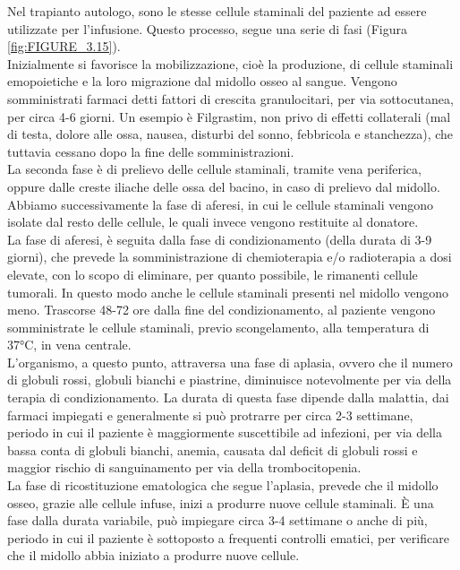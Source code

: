 Nel trapianto autologo, sono le stesse cellule staminali del paziente ad essere utilizzate per l’infusione. 
Questo processo, segue una serie di fasi (Figura \ref{fig:FIGURE_3.15}).\\
Inizialmente si favorisce la mobilizzazione, cioè la produzione, di cellule staminali emopoietiche e la 
loro migrazione dal midollo osseo al sangue. Vengono somministrati farmaci detti fattori di crescita granulocitari, 
per via sottocutanea, per circa 4-6 giorni\cite{TRAPIANTO}. Un esempio è Filgrastim, non privo di effetti 
collaterali (mal di testa, dolore alle ossa, nausea, disturbi del sonno, febbricola e stanchezza), 
che tuttavia cessano dopo la fine delle somministrazioni\cite{STEMCELLS}.\\
La seconda fase è di prelievo delle cellule staminali, tramite vena periferica, oppure dalle creste iliache delle 
ossa del bacino, in caso di prelievo dal midollo.\\ 
Abbiamo successivamente la fase di aferesi, in cui le cellule staminali vengono isolate dal resto delle cellule, 
le quali invece vengono restituite al donatore\cite{TRAPIANTO}.\\ 
La fase di aferesi, è seguita dalla fase di condizionamento (della durata di 3-9 giorni), che prevede la 
somministrazione di chemioterapia e/o radioterapia a dosi elevate, con lo scopo di eliminare, 
per quanto possibile, le rimanenti cellule tumorali. In questo modo anche 
le cellule staminali presenti nel midollo vengono meno. Trascorse 48-72 ore dalla fine del condizionamento, 
al paziente vengono somministrate le cellule staminali, previo scongelamento, alla temperatura di 37°C, 
in vena centrale\cite{TRAPIANTO}.\\
L’organismo, a questo punto, attraversa una fase di aplasia, ovvero che il numero di globuli rossi, globuli bianchi e 
piastrine, diminuisce notevolmente per via della terapia di condizionamento. La durata di questa fase dipende 
dalla malattia, dai farmaci impiegati e generalmente si può protrarre per circa 2-3 settimane\cite{TRAPIANTO}, 
periodo in cui il paziente è maggiormente suscettibile ad infezioni, per via della bassa conta di globuli bianchi, 
anemia, causata dal deficit di globuli rossi e maggior rischio di sanguinamento per via della trombocitopenia\cite{LLSBLOOD}.\\
La fase di ricostituzione ematologica che segue l’aplasia, prevede che il midollo osseo, grazie alle cellule infuse, 
inizi a produrre nuove cellule staminali\cite{TRAPIANTO}.
È una fase dalla durata variabile, può impiegare circa 3-4 settimane o anche di più, periodo in cui il paziente 
è sottoposto a frequenti controlli ematici, per verificare che il midollo abbia iniziato a produrre nuove cellule\cite{LLSBLOOD}.\\

